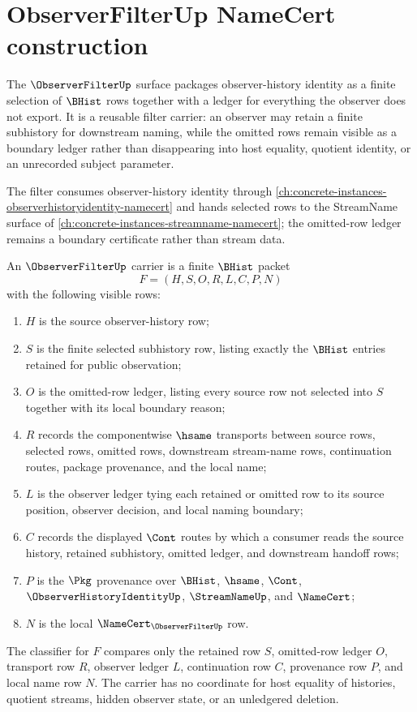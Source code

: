 \chapter{ObserverFilterUp NameCert construction}
\label{ch:concrete-instances-observer-filter-namecert}

The $\ObserverFilterUp$ surface packages observer-history identity as a finite selection of $\BHist$ rows together with a ledger for everything the observer does not export. It is a reusable filter carrier: an observer may retain a finite subhistory for downstream naming, while the omitted rows remain visible as a boundary ledger rather than disappearing into host equality, quotient identity, or an unrecorded subject parameter.

The filter consumes observer-history identity through \autoref{ch:concrete-instances-observerhistoryidentity-namecert} and hands selected rows to the StreamName surface of \autoref{ch:concrete-instances-streamname-namecert}; the omitted-row ledger remains a boundary certificate rather than stream data.

\begin{definition}
\label{def:observer-filter-bhist-carrier}
An $\ObserverFilterUp$ carrier is a finite $\BHist$ packet
$$
F=(H,S,O,R,L,C,P,N)
$$
with the following visible rows:
\begin{enumerate}
\item $H$ is the source observer-history row;
\item $S$ is the finite selected subhistory row, listing exactly the $\BHist$ entries retained for public observation;
\item $O$ is the omitted-row ledger, listing every source row not selected into $S$ together with its local boundary reason;
\item $R$ records the componentwise $\hsame$ transports between source rows, selected rows, omitted rows, downstream stream-name rows, continuation routes, package provenance, and the local name;
\item $L$ is the observer ledger tying each retained or omitted row to its source position, observer decision, and local naming boundary;
\item $C$ records the displayed $\Cont$ routes by which a consumer reads the source history, retained subhistory, omitted ledger, and downstream handoff rows;
\item $P$ is the $\Pkg$ provenance over $\BHist$, $\hsame$, $\Cont$, $\ObserverHistoryIdentityUp$, $\StreamNameUp$, and $\NameCert$;
\item $N$ is the local $\NameCert_{\ObserverFilterUp}$ row.
\end{enumerate}
The classifier for $F$ compares only the retained row $S$, omitted-row ledger $O$, transport row $R$, observer ledger $L$, continuation row $C$, provenance row $P$, and local name row $N$. The carrier has no coordinate for host equality of histories, quotient streams, hidden observer state, or an unledgered deletion.
\end{definition}

